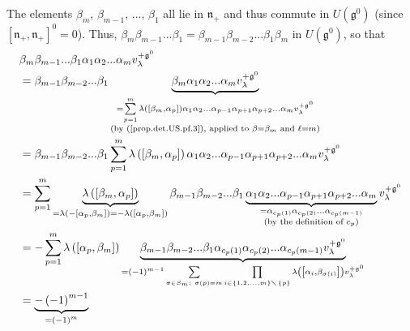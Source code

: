 \documentclass
[numbers=enddot,12pt,final,onecolumn,german,notitlepage]{scrartcl}%
\theoremstyle{definition}
\begin{document}
The elements $\beta_{m}$, $\beta_{m-1}$, $...$, $\beta_{1}$ all lie in
$\mathfrak{n}_{+}$ and thus commute in $U\left(  \mathfrak{g}^{0}\right)  $
(since $\left[  \mathfrak{n}_{+},\mathfrak{n}_{+}\right]  ^{0}=0$). Thus,
$\beta_{m}\beta_{m-1}...\beta_{1}=\beta_{m-1}\beta_{m-2}...\beta_{1}\beta_{m}$
in $U\left(  \mathfrak{g}^{0}\right)  $, so that%
\begin{align*}
&  \beta_{m}\beta_{m-1}...\beta_{1}\alpha_{1}\alpha_{2}...\alpha_{m}%
v_{\lambda}^{+\mathfrak{g}^{0}}\\
&  =\beta_{m-1}\beta_{m-2}...\beta_{1}\underbrace{\beta_{m}\alpha_{1}%
\alpha_{2}...\alpha_{m}v_{\lambda}^{+\mathfrak{g}^{0}}}_{\substack{=\sum
\limits_{p=1}^{m}\lambda\left(  \left[  \beta_{m},\alpha_{p}\right]  \right)
\alpha_{1}\alpha_{2}...\alpha_{p-1}\alpha_{p+1}\alpha_{p+2}...\alpha
_{m}v_{\lambda}^{+\mathfrak{g}^{0}}\\\text{(by (\ref{prop.det.US.pf.3}),
applied to }\beta=\beta_{m}\text{ and }\ell=m\text{)}}}\\
&  =\beta_{m-1}\beta_{m-2}...\beta_{1}\sum\limits_{p=1}^{m}\lambda\left(
\left[  \beta_{m},\alpha_{p}\right]  \right)  \alpha_{1}\alpha_{2}%
...\alpha_{p-1}\alpha_{p+1}\alpha_{p+2}...\alpha_{m}v_{\lambda}^{+\mathfrak{g}%
^{0}}\\
&  =\sum\limits_{p=1}^{m}\underbrace{\lambda\left(  \left[  \beta_{m}%
,\alpha_{p}\right]  \right)  }_{=\lambda\left(  -\left[  \alpha_{p},\beta
_{m}\right]  \right)  =-\lambda\left(  \left[  \alpha_{p},\beta_{m}\right]
\right)  }\beta_{m-1}\beta_{m-2}...\beta_{1}\underbrace{\alpha_{1}\alpha
_{2}...\alpha_{p-1}\alpha_{p+1}\alpha_{p+2}...\alpha_{m}}_{\substack{=\alpha
_{c_{p}\left(  1\right)  }\alpha_{c_{p}\left(  2\right)  }...\alpha
_{c_{p}\left(  m-1\right)  }\\\text{(by the definition of }c_{p}\text{)}%
}}v_{\lambda}^{+\mathfrak{g}^{0}}\\
&  =-\sum\limits_{p=1}^{m}\lambda\left(  \left[  \alpha_{p},\beta_{m}\right]
\right)  \underbrace{\beta_{m-1}\beta_{m-2}...\beta_{1}\alpha_{c_{p}\left(
1\right)  }\alpha_{c_{p}\left(  2\right)  }...\alpha_{c_{p}\left(  m-1\right)
}v_{\lambda}^{+\mathfrak{g}^{0}}}_{=\left(  -1\right)  ^{m-1}\sum
\limits_{\sigma\in S_{m};\ \sigma\left(  p\right)  =m}\prod\limits_{i\in
\left\{  1,2,...,m\right\}  \diagdown\left\{  p\right\}  }\lambda\left(
\left[  \alpha_{i},\beta_{\sigma\left(  i\right)  }\right]  \right)
v_{\lambda}^{+\mathfrak{g}^{0}}}\\
&  =\underbrace{-\left(  -1\right)  ^{m-1}}_{=\left(  -1\right)  ^{m}}%

\end{align*}
\end{document}
